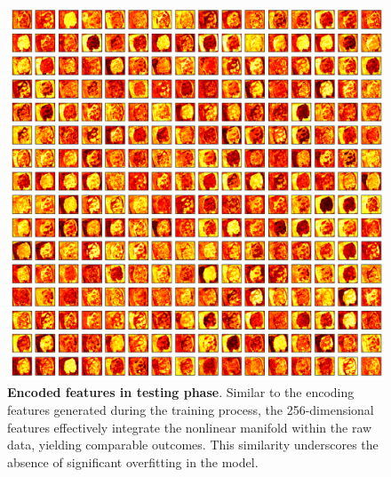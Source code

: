 \documentclass{WileyMSP-template}
\begin{document}
\begin{figure}[htbp]
    \includegraphics[width=\linewidth]{pic/encoder_feature_3D_test.png}
    \captionsetup{justification=raggedright,singlelinecheck=false}
    \caption
    {
      \textbf{Encoded features in testing phase}. 
      Similar to the encoding features generated during the 
      training process, the 256-dimensional features effectively 
      integrate the nonlinear manifold within the raw data, yielding 
      comparable outcomes. This similarity underscores 
      the absence of significant overfitting in the model. 
    }
    \label{fig:encoder_feature_3D_test}
\end{figure}


\newpage
\end{document}
